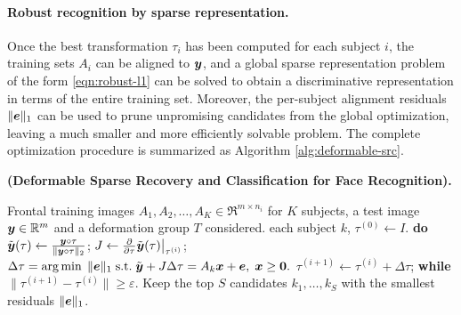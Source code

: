 \paragraph{Robust recognition by sparse representation.}
Once the best transformation $\tau_i$ has been computed for each subject $i$, the training sets $A_i$ can be aligned to ${\boldsymbol{y}}$, and a global sparse representation problem of the form \eqref{eqn:robust-l1} can be solved to obtain a discriminative representation in terms of the entire training set. Moreover, the per-subject alignment residuals $\| \boldsymbol{e} \|_1$ can be used to prune unpromising candidates from the global optimization, leaving a much smaller and more efficiently solvable problem. The complete optimization procedure is summarized as Algorithm \ref{alg:deformable-src}. \vspace{0mm}
\begin{algorithm}[thb]
\begin{small}
\caption{\bf \small  (Deformable Sparse Recovery and Classification for Face Recognition).} \label{alg:deformable-src}
\begin{algorithmic}[1]
 Frontal training images $A_1, A_2, \ldots, A_K \in \Re^{m\times n_i}$ for $K$ subjects,  a test image ${\boldsymbol{y}}\in\mathbb R^m$ and a deformation group $T$ considered.
 each subject $k$, 
\STATE \hspace{3mm} $\tau^{(0)} \leftarrow I$.
\STATE \hspace{3mm} {\bf do}
\STATE \hspace{6mm} $\tilde {{\boldsymbol{y}}}(\tau) \leftarrow \frac{{\boldsymbol{y}} \circ \tau}{\|{\boldsymbol{y}} \circ \tau\|_2}$; \;\;\; $J \leftarrow  \frac{\partial}{\partial \tau} \tilde{{\boldsymbol{y}}}(\tau)  \bigr|_{\tau^{(i)}} $;\vspace{0mm}
\STATE \hspace{6mm} $ \Delta \tau =  \arg\min \; \| \boldsymbol{e} \|_1  \; \mathrm{s.t.} \; \tilde {{\boldsymbol{y}}} + J \Delta \tau = A_k {\boldsymbol{x}} + \boldsymbol{e}, \; {\boldsymbol{x}} \ge \boldsymbol{0}.$
\STATE \hspace{6mm} $\tau^{(i+1)} \leftarrow \tau^{(i)} + \Delta \tau$; 
\STATE \hspace{3mm} {\bf while} $\| \tau^{(i+1)} - \tau^{(i)} \| \ge \varepsilon$.
\STATE Keep the top $S$ candidates $k_1, \ldots, k_S$ with the smallest residuals $\|\boldsymbol{e}\|_1$. 

\end{algorithmic}
\end{small}
\end{algorithm}
